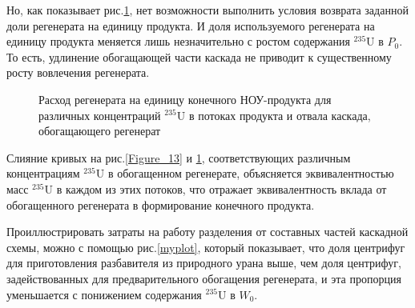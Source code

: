Но, как показывает рис.\ref{Figure_10}, нет возможности выполнить условия возврата заданной доли регенерата на единицу продукта. И доля используемого регенерата на единицу продукта меняется лишь незначительно с ростом содержания $^{235}$U в $P_0$. То есть, удлинение  обогащающей части каскада не приводит к существенному росту вовлечения регенерата.

\begin{figure}[ht]
  \caption{Расход регенерата на единицу конечного НОУ-продукта для различных концентраций $^{235}$U в потоках продукта и отвала каскада, обогащающего регенерат}\label{Figure_10}
\end{figure}

Слияние кривых на рис.\ref{Figure_13} и \ref{Figure_10}, соответствующих различным концентрациям $^{235}$U в обогащенном регенерате, объясняется эквивалентностью масс $^{235}$U в каждом из этих потоков, что отражает эквивалентность вклада от обогащенного регенерата в формирование конечного продукта.

Проиллюстрировать затраты на работу разделения от составных  частей каскадной схемы, можно с помощью рис.\ref{myplot}, который показывает, что доля центрифуг для приготовления разбавителя из природного урана выше, чем доля центрифуг, задействованных для предварительного обогащения регенерата, и эта пропорция уменьшается с понижением содержания $^{235}$U в $W_0$.

